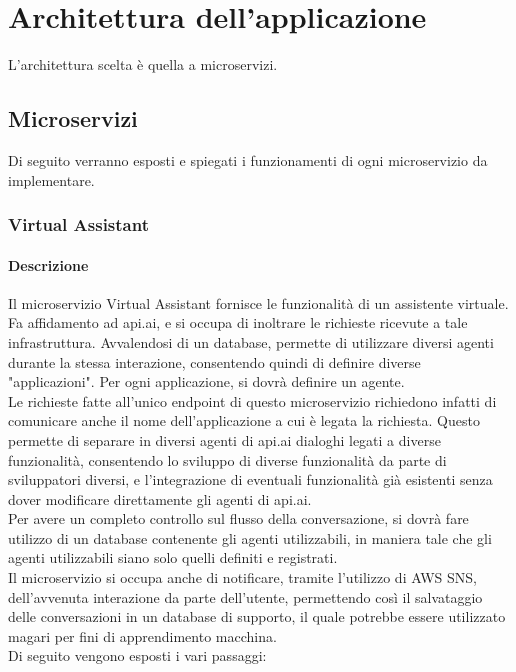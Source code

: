 \section{Architettura dell'applicazione}
L'architettura scelta è quella a microservizi.\\
\subsection{Microservizi}
Di seguito verranno esposti e spiegati i funzionamenti di ogni microservizio da implementare.
\subsubsection{Virtual Assistant}
\paragraph{Descrizione}
Il microservizio Virtual Assistant fornisce le funzionalità di un assistente virtuale. Fa affidamento ad api.ai, e si occupa di inoltrare le richieste ricevute a tale infrastruttura. Avvalendosi di un database, permette di utilizzare diversi agenti durante la stessa interazione, consentendo quindi di definire diverse "applicazioni". Per ogni applicazione, si dovrà definire un agente.\\ Le richieste fatte all'unico endpoint di questo microservizio richiedono infatti di comunicare anche il nome dell'applicazione a cui è legata la richiesta. Questo permette di separare in diversi agenti di api.ai dialoghi legati a diverse funzionalità, consentendo lo sviluppo di diverse funzionalità da parte di sviluppatori diversi, e l'integrazione di eventuali funzionalità già esistenti senza dover modificare direttamente gli agenti di api.ai. \\
Per avere un completo controllo sul flusso della conversazione, si dovrà fare utilizzo di un database contenente gli agenti utilizzabili, in maniera tale che gli agenti utilizzabili siano solo quelli definiti e registrati.\\
Il microservizio si occupa anche di notificare, tramite l'utilizzo di AWS SNS, dell'avvenuta interazione da parte dell'utente, permettendo così il salvataggio delle conversazioni in un database di supporto, il quale potrebbe essere utilizzato magari per fini di apprendimento macchina.\\
Di seguito vengono esposti i vari passaggi:
